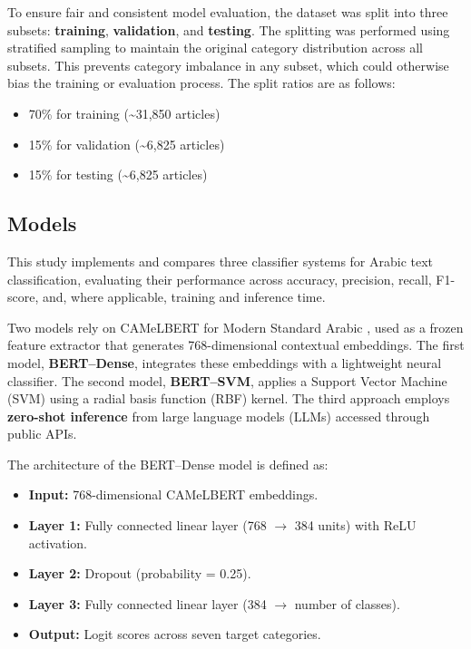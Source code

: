 \documentclass[sn-mathphys-num]{sn-jnl}
\begin{document}
To ensure fair and consistent model evaluation, the dataset was split into three subsets: \textbf{training}, \textbf{validation}, and \textbf{testing}. The splitting was performed using stratified sampling to maintain the original category distribution across all subsets. This prevents category imbalance in any subset, which could otherwise bias the training or evaluation process. The split ratios are as follows:
\begin{itemize}
    \item 70\% for training (\textasciitilde31,850 articles)
    \item 15\% for validation (\textasciitilde6,825 articles)
    \item 15\% for testing (\textasciitilde6,825 articles)
\end{itemize}

\subsection{Models}

This study implements and compares three classifier systems for Arabic text classification, evaluating their performance across accuracy, precision, recall, F1-score, and, where applicable, training and inference time.

Two models rely on CAMeLBERT for Modern Standard Arabic \cite{DBLP:journals/corr/abs-2103-06678}, used as a frozen feature extractor that generates 768-dimensional contextual embeddings. The first model, \textbf{BERT–Dense}, integrates these embeddings with a lightweight neural classifier. The second model, \textbf{BERT–SVM}, applies a Support Vector Machine (SVM) using a radial basis function (RBF) kernel. The third approach employs \textbf{zero-shot inference} from large language models (LLMs) accessed through public APIs.

\noindent The architecture of the BERT–Dense model is defined as:
\begin{itemize}
    \item \textbf{Input:} 768-dimensional CAMeLBERT embeddings.
    \item \textbf{Layer 1:} Fully connected linear layer (768 $\rightarrow$ 384 units) with ReLU activation.
    \item \textbf{Layer 2:} Dropout (probability = 0.25).
    \item \textbf{Layer 3:} Fully connected linear layer (384 $\rightarrow$ number of classes).
    \item \textbf{Output:} Logit scores across seven target categories.
\end{itemize}
\end{document}
